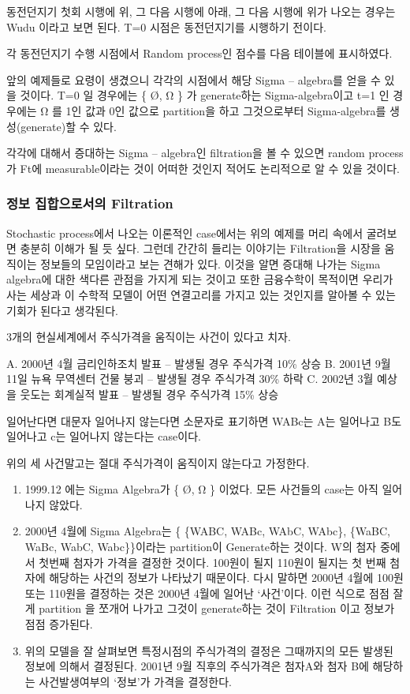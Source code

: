 \documentclass[
]{book}
\providecommand{\tightlist}{%
  \setlength{\itemsep}{0pt}\setlength{\parskip}{0pt}}
\begin{document}
{{{동전던지기 첫회 시행에 위, 그 다음 시행에 아래, 그 다음 시행에 위가 나오는 경우는 Wudu 이라고 보면 된다. T=0 시점은 동전던지기를 시행하기 전이다.

각 동전던지기 수행 시점에서 Random process인 점수를 다음 테이블에 표시하였다.

앞의 예제들로 요령이 생겼으니 각각의 시점에서 해당 Sigma -- algebra를 얻을 수 있을 것이다. T=0 일 경우에는 \{ Ø, Ω \} 가 generate하는 Sigma-algebra이고 t=1 인 경우에는 Ω 를 1인 값과 0인 값으로 partition을 하고 그것으로부터 Sigma-algebra를 생성(generate)할 수 있다.

각각에 대해서 증대하는 Sigma -- algebra인 filtration을 볼 수 있으면 random process가 Ft에 measurable이라는 것이 어떠한 것인지 적어도 논리적으로 알 수 있을 것이다.

\hypertarget{uxc815uxbcf4-uxc9d1uxd569uxc73cuxb85cuxc11cuxc758-filtration}{%
\subsubsection{정보 집합으로서의 Filtration}\label{uxc815uxbcf4-uxc9d1uxd569uxc73cuxb85cuxc11cuxc758-filtration}}

Stochastic process에서 나오는 이론적인 case에서는 위의 예제를 머리 속에서 굴려보면 충분히 이해가 될 듯 싶다. 그런데 간간히 들리는 이야기는 Filtration을 시장을 움직이는 정보들의 모임이라고 보는 견해가 있다. 이것을 알면 증대해 나가는 Sigma algebra에 대한 색다른 관점을 가지게 되는 것이고 또한 금융수학이 목적이면 우리가 사는 세상과 이 수학적 모델이 어떤 연결고리를 가지고 있는 것인지를 알아볼 수 있는 기회가 된다고 생각된다.

3개의 현실세계에서 주식가격을 움직이는 사건이 있다고 치자.

A. 2000년 4월 금리인하조치 발표 -- 발생될 경우 주식가격 10\% 상승
B. 2001년 9월 11일 뉴욕 무역센터 건물 붕괴 -- 발생될 경우 주식가격 30\% 하락
C. 2002년 3월 예상을 웃도는 회계실적 발표 -- 발생될 경우 주식가격 15\% 상승

일어난다면 대문자 일어나지 않는다면 소문자로 표기하면 WABc는 A는 일어나고 B도 일어나고 c는 일어나지 않는다는 case이다.

위의 세 사건말고는 절대 주식가격이 움직이지 않는다고 가정한다.

\begin{enumerate}
\def\labelenumi{\arabic{enumi}.}
\tightlist
\item
  1999.12 에는 Sigma Algebra가 \{ Ø, Ω \} 이었다. 모든 사건들의 case는 아직 일어나지 않았다.
\item
  2000년 4월에 Sigma Algebra는 \{ \{WABC, WABc, WAbC, WAbc\}, \{WaBC, WaBc, WabC, Wabc\}\}이라는 partition이 Generate하는 것이다. W의 첨자 중에서 첫번째 첨자가 가격을 결정한 것이다. 100원이 될지 110원이 될지는 첫 번째 첨자에 해당하는 사건의 정보가 나타났기 때문이다. 다시 말하면 2000년 4월에 100원 또는 110원을 결정하는 것은 2000년 4월에 일어난 `사건'이다. 이런 식으로 점점 잘게 partition 을 쪼개어 나가고 그것이 generate하는 것이 Filtration 이고 정보가 점점 증가된다.
\item
  위의 모델을 잘 살펴보면 특정시점의 주식가격의 결정은 그때까지의 모든 발생된 정보에 의해서 결정된다. 2001년 9월 직후의 주식가격은 첨자A와 첨자 B에 해당하는 사건발생여부의 `정보'가 가격을 결정한다.
\end{enumerate}

}}}
\end{document}
